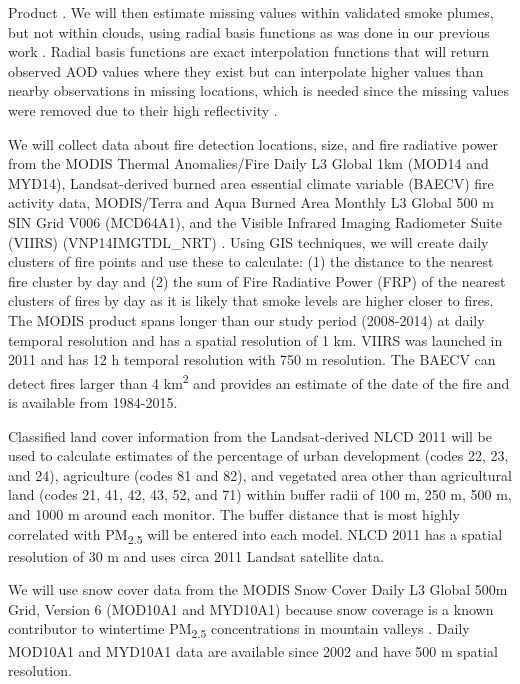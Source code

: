\documentclass[authoryear]{elsarticle}
\begin{document}
\noindent Product  \citep{NOAAHazMap2017}. We will then estimate missing values within validated smoke plumes, but not within clouds, using radial basis functions as was done in our previous work \citep{Reid2015}. Radial basis functions are exact interpolation functions that will return observed AOD values where they exist but can interpolate higher values than nearby observations in missing locations, which is needed since the missing values were removed due to their high reflectivity \citep{Reid2015}.

We will collect data about fire detection locations, size, and fire radiative power from the MODIS Thermal Anomalies/Fire Daily L3 Global 1km (MOD14 and MYD14), Landsat-derived burned area essential climate variable (BAECV) fire activity data, MODIS/Terra and Aqua Burned Area Monthly L3 Global 500 m SIN Grid V006 (MCD64A1), and the Visible Infrared Imaging Radiometer Suite (VIIRS) (VNP14IMGTDL\_NRT) 
\citep{Giglio2006,Hawbaker2017,MODISBurnArea,Schroeder2014}. 
Using GIS techniques, we will create daily clusters of fire points and use these to calculate: (1) the distance to the nearest fire cluster by day and (2) the sum of Fire Radiative Power (FRP) of the nearest clusters of fires by day as it is likely that smoke levels are higher closer to fires. The MODIS product spans longer than our study period (2008-2014) at daily temporal resolution and has a spatial resolution of 1 km. VIIRS was launched in 2011 and has 12 h temporal resolution with 750 m resolution. The BAECV can detect fires larger than 4 km\textsuperscript{2} and provides an estimate of the date of the fire and is available from 1984-2015. 

Classified land cover information from the Landsat-derived NLCD 2011 
\citep{Homer2017} will be used to calculate estimates of the percentage of urban development (codes 22, 23, and 24), agriculture (codes 81 and 82), and vegetated area other than agricultural land (codes 21, 41, 42, 43, 52, and 71) within buffer radii of 100 m, 250 m, 500 m, and 1000 m around each monitor. The buffer distance that is most highly correlated with PM\textsubscript{2.5} will be entered into each model. NLCD 2011 has a spatial resolution of 30 m and uses circa 2011 Landsat satellite data. 

We will use snow cover data from the MODIS Snow Cover Daily L3 Global 500m Grid, Version 6 (MOD10A1 and MYD10A1) \citep{Hall2016} because snow coverage is a known contributor to wintertime PM\textsubscript{2.5} concentrations in mountain valleys \citep{Whiteman2014}. Daily MOD10A1 and MYD10A1 data are available since 2002 and have 500 m spatial resolution. 
\end{document}
